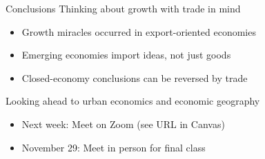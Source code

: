 \documentclass[10pt,notes=hide]{beamer}
\begin{document}
\begin{frame}{Conclusions}
Thinking about growth with trade in mind
\begin{itemize}
\item Growth miracles occurred in export-oriented economies
\item Emerging economies import ideas, not just goods
\item Closed-economy conclusions can be reversed by trade
\end{itemize}
\vspace{1cm}
Looking ahead to urban economics and economic geography
\begin{itemize}
\item Next week: Meet on Zoom (see URL in Canvas)
\item November 29: Meet in person for final class
\end{itemize}
\end{frame}
\end{document}

